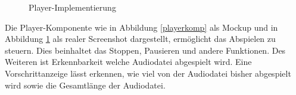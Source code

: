 \begin{figure}[ht]
\begin{minipage}[b]{0.45\linewidth}
\caption{Player-Implementierung}
\label{player}
\end{minipage}
\end{figure}

Die Player-Komponente wie in Abbildung \ref{playerkomp} als Mockup und in Abbildung \ref{player} als realer Screenshot dargestellt, ermöglicht das Abspielen zu steuern. Dies beinhaltet das Stoppen, Pausieren und andere Funktionen. Des Weiteren ist Erkennbarkeit welche Audiodatei abgespielt wird. Eine Vorschrittanzeige lässt erkennen, wie viel von der Audiodatei bisher abgespielt wird sowie die Gesamtlänge der Audiodatei.

